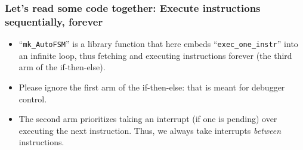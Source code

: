 
\begin{frame}[fragile]
\frametitle{Let's read some code together: Execute instructions sequentially, forever}

\begin{center}\scriptsize


 \vspace*{5ex}

 \begin{minipage}{0.8\textwidth}
  \begin{itemize}

   \item ``{\tt mk\_AutoFSM}'' is a {\BSV} library function that here
     embeds ``{\tt exec\_one\_instr}'' into an infinite loop, thus
     fetching and executing instructions forever (the third arm of the
     if-then-else).

   \vspace*{1ex}

   \item Please ignore the first arm of the if-then-else: that is
     meant for debugger control.

   \vspace*{1ex}

   \item The second arm prioritizes taking an interrupt (if one is
     pending) over executing the next instruction.  Thus, we always
     take interrupts \emph{between} instructions.

  \end{itemize}

 \end{minipage}
\end{center}

\end{frame}


